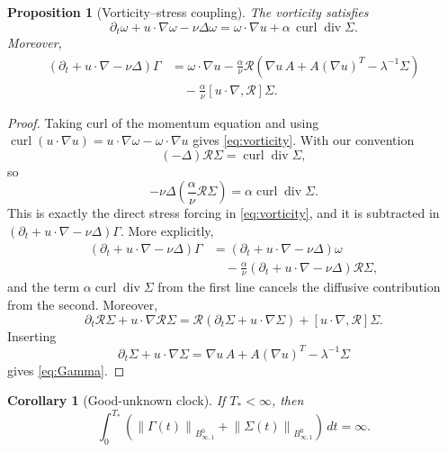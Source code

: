 \documentclass[11pt]{article}
\numberwithin{equation}{section}
\newtheorem{proposition}[theorem]{Proposition}
\newtheorem{corollary}[theorem]{Corollary}
\newcommand{\divv}{\operatorname{div}}
\newcommand{\curl}{\operatorname{curl}}
\newcommand{\Besov}{B^0_{\infty,1}}
\newcommand{\calR}{\mathcal R}
\newcommand{\norm}[1]{\left\lVert #1\right\rVert}
\begin{document}
\begin{proposition}[Vorticity--stress coupling]
\label{prop:vorticity-stress}
The vorticity satisfies
\begin{equation}
  \partial_t\omega+u\cdot\nabla\omega-\nu\Delta\omega
  =
  \omega\cdot\nabla u+\alpha\,\curl\divv\Sigma .
  \label{eq:vorticity}
\end{equation}
Moreover,
\begin{equation}
\begin{aligned}
  (\partial_t+u\cdot\nabla-\nu\Delta)\Gamma
  &=
  \omega\cdot\nabla u
  -\frac{\alpha}{\nu}\calR
  \left(\nabla u\,A+A(\nabla u)^T-\lambda^{-1}\Sigma\right)\\
  &\quad
  -\frac{\alpha}{\nu}[u\cdot\nabla,\calR]\Sigma .
\end{aligned}
  \label{eq:Gamma}
\end{equation}
\end{proposition}

\begin{proof}
Taking curl of the momentum equation and using
\(\curl(u\cdot\nabla u)=u\cdot\nabla\omega-\omega\cdot\nabla u\) gives
\eqref{eq:vorticity}.  With our convention
\[
  (-\Delta)\calR\Sigma=\curl\divv\Sigma,
\]
so
\[
  -\nu\Delta\left(\frac{\alpha}{\nu}\calR\Sigma\right)
  =
  \alpha\curl\divv\Sigma .
\]
This is exactly the direct stress forcing in \eqref{eq:vorticity}, and it is
subtracted in \((\partial_t+u\cdot\nabla-\nu\Delta)\Gamma\).  More explicitly,
\[
\begin{aligned}
(\partial_t+u\cdot\nabla-\nu\Delta)\Gamma
&=(\partial_t+u\cdot\nabla-\nu\Delta)\omega\\
&\quad
-\frac{\alpha}{\nu}
(\partial_t+u\cdot\nabla-\nu\Delta)\calR\Sigma ,
\end{aligned}
\]
and the term \(\alpha\curl\divv\Sigma\) from the first line cancels the
diffusive contribution from the second.  Moreover,
\[
  \partial_t\calR\Sigma+u\cdot\nabla\calR\Sigma
  =
  \calR(\partial_t\Sigma+u\cdot\nabla\Sigma)
  +[u\cdot\nabla,\calR]\Sigma .
\]
Inserting
\[
  \partial_t\Sigma+u\cdot\nabla\Sigma
  =
  \nabla u\,A+A(\nabla u)^T-\lambda^{-1}\Sigma
\]
gives \eqref{eq:Gamma}.
\end{proof}

\begin{corollary}[Good-unknown clock]
\label{cor:good}
If \(T_*<\infty\), then
\[
  \int_0^{T_*}
  \left(
  \norm{\Gamma(t)}_{\Besov}
  +\norm{\Sigma(t)}_{\Besov}
  \right)\,dt=\infty .
\]
\end{corollary}
\end{document}
